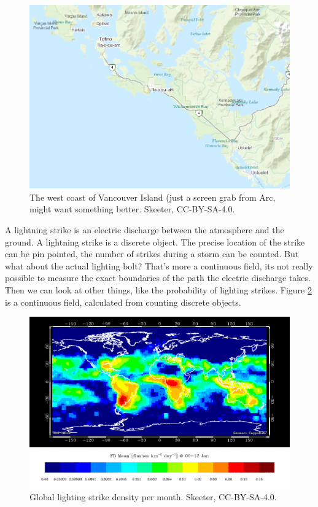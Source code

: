 \documentclass[
]{book}
\begin{document}
\begin{figure}
\includegraphics[width=0.75\linewidth]{images/03-beach-small-scale} \caption{The west coast of Vancouver Island (just a screen grab from Arc, might want something better. Skeeter, CC-BY-SA-4.0.}\label{fig:3-beach-small-scale}
\end{figure}

A lightning strike is an electric discharge between the atmosphere and the ground. A lightning strike is a discrete object. The precise location of the strike can be pin pointed, the number of strikes during a storm can be counted. But what about the actual lighting bolt? That's more a continuous field, its not really possible to measure the exact boundaries of the path the electric discharge takes. Then we can look at other things, like the probability of lighting strikes. Figure \ref{fig:3-lightning-density} is a continuous field, calculated from counting discrete objects.

\begin{figure}
\includegraphics[width=0.75\linewidth]{images/03-lightning-density} \caption{Global lighting strike density per month. Skeeter, CC-BY-SA-4.0.}\label{fig:3-lightning-density}
\end{figure}
\end{document}
